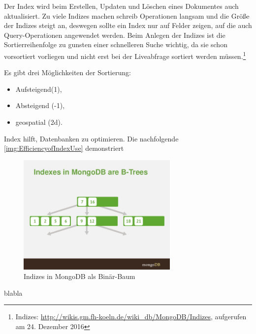 Der Index wird beim Erstellen, Updaten und Löschen eines Dokumentes auch aktualisiert. Zu viele Indizes machen schreib Operationen langsam und die Größe der Indizes steigt an, deswegen sollte ein Index nur auf Felder zeigen, auf die auch Query-Operationen angewendet werden. Beim Anlegen der Indizes ist die Sortierreihenfolge zu gunsten einer schnelleren Suche wichtig, da sie schon vorsortiert vorliegen und nicht erst bei der Liveabfrage sortiert werden müssen.\footnote{Indizes: \url{http://wikis.gm.fh-koeln.de/wiki_db/MongoDB/Indizes}, aufgerufen am 24. Dezember 2016}

Es gibt drei Möglichkeiten der Sortierung:

\begin{itemize}
\item Aufsteigend(1),
\item Absteigend (-1),
\item geospatial (2d).
\end{itemize}

Index hilft, Datenbanken zu optimieren. Die nachfolgende \autoref{img:EfficiencyofIndexUse} demonstriert

\begin{figure}[H]
\centering
	\includegraphics[width=0.7\textwidth]{resources/indexingBtree}
\caption[Indizes in MongoDB als Binär-Baum]{Indizes in MongoDB als Binär-Baum\protect\footnotemark}
\label{img:IndexesInMongoDBAreB-Trees}
\end{figure}

blabla

